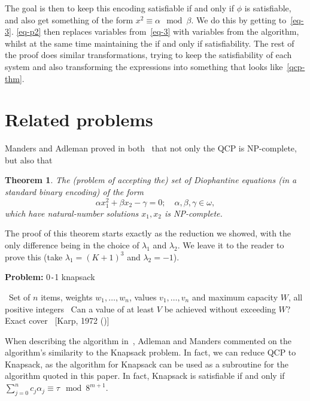 \documentclass{amsart}
\theoremstyle{plain}
\newtheorem{theorem}{Theorem}
\begin{document}
The goal is then to keep this encoding satisfiable if and only if $\phi$ is satisfiable, and also
get something of the form $x^2\equiv\alpha\mod\beta$. We do this by getting to~\autoref{eq-3}.
\autoref{eq-p2} then replaces variables from~\autoref{eq-3} with variables from the algorithm,
whilst at the same time maintaining the if and only if satisfiability. The rest of the proof does
similar transformations, trying to keep the satisfiability of each system and also transforming
the expressions into something that looks like~\autoref{qcp-thm}.

\section{Related problems}

Manders and Adleman proved in both~\cite{qcp1,qcp2} that not only the QCP is NP-complete, but also
that

\begin{theorem}\label{diophantine-thm}
  The (problem of accepting the) set of Diophantine equations (in a standard binary encoding) of
  the form
  \begin{equation*}
    \alpha x_1^2+\beta x_2-\gamma=0;\quad\alpha,\beta,\gamma\in\omega,
  \end{equation*}
  which have natural-number solutions $x_1,x_2$ is NP-complete.
\end{theorem}

The proof of this theorem starts exactly as the reduction we showed, with the only difference being
in the choice of $\lambda_1$ and $\lambda_2$. We leave it to the reader to prove this (take
$\lambda_1={(K+1)}^3$ and $\lambda_2=-1$).

\begin{algorithm}[h]
  \caption*{\textbf{Problem:} 0\texttt{-}1 knapsack}
  \begin{algorithmic}[1]
    \Require\, Set of $n$ items, weights $w_1,\ldots,w_n$, values $v_1,\ldots,v_n$ and maximum
    capacity $W$, all positive integers
    \Description\, Can a value of at least $V$ be achieved without exceeding $W$?
    \Reduction\, Exact cover
    \Reference\, [Karp, 1972 (\cite{karp})]
  \end{algorithmic}
\end{algorithm}

When describing the algorithm in~\cite{qcp2}, Adleman and Manders commented on the algorithm's
similarity to the Knapsack problem. In fact, we can reduce QCP to Knapsack, as the algorithm for
Knapsack can be used as a subroutine for the algorithm quoted in this paper. In fact, Knapsack is
satisfiable if and only if $\sum_{j=0}^n c_j\alpha_j\equiv\tau\mod 8^{m+1}$.
\end{document}
